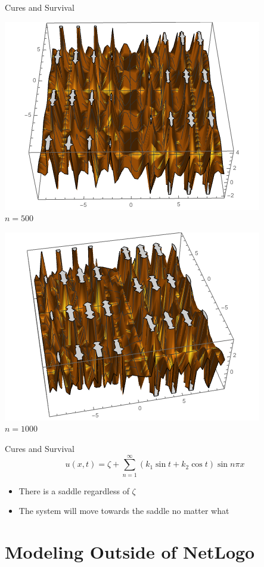 \documentclass{beamer}
\begin{document}
\begin{frame}{Cures and Survival}
\begin{center}
\begin{minipage}{0.4\textwidth}
\pause\includegraphics[scale=0.3]{cure_0201}\\
$n=500$
\end{minipage}
\begin{minipage}{0.4\textwidth}
\pause\includegraphics[scale=0.3]{cure_03}\\
$n=1000$
\end{minipage}

\end{center}
\end{frame}

\begin{frame}{Cures and Survival}
\[
u(x,t)=\zeta+\sum_{n=1}^{\infty}(k_{1}\sin{t}+k_{2}\cos{t})\sin{n\pi x}
\]
\begin{itemize}
\item There is a saddle regardless of $\zeta$
\pause
\item The system will move towards the saddle no matter what
\end{itemize}
\end{frame}

\section{Modeling Outside of NetLogo}
\end{document}
